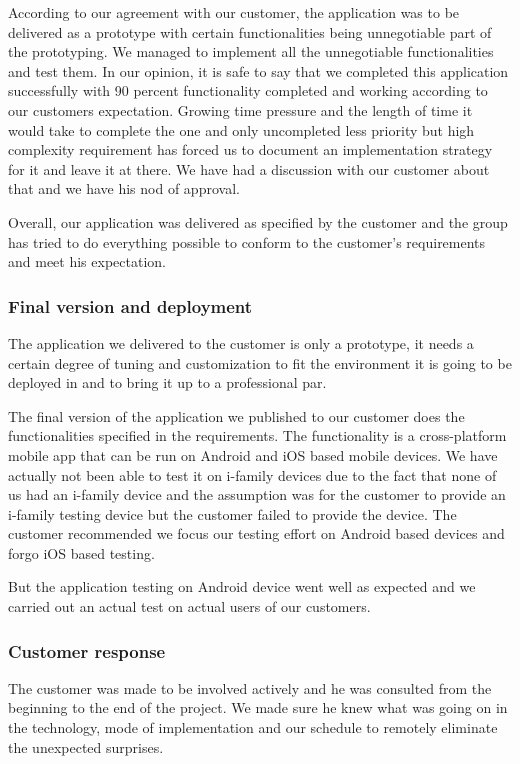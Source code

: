     According to our agreement with our customer, the application was to be delivered as a prototype with certain functionalities being unnegotiable part of the prototyping. We managed to implement all the unnegotiable functionalities and test them. In our opinion, it is safe to say that we completed this application successfully with 90 percent functionality completed and working according to our customers expectation. Growing time pressure and the length of time it would take to complete the one and only uncompleted less priority but high complexity requirement has forced us to document an implementation strategy for it and leave it at there. We have had a discussion with our customer about that and we have his nod of approval.

    Overall, our application was delivered as specified by the customer and the group has tried to do everything possible to conform to the customer's requirements and meet his expectation.
	\subsubsection{Final version and deployment}
The application we delivered to the customer is only a prototype, it needs a certain degree of tuning and customization to fit the environment it is going to be deployed in and to bring it up to a professional par.

The final version of the application we published to our customer does the functionalities specified in the requirements. The functionality is a cross-platform mobile app that can be run on Android and iOS based mobile devices. We have actually not been able to test it on i-family devices due to the fact that none of us had an i-family device and the assumption was for the customer to provide an i-family testing device but the customer failed to provide the device. The customer recommended we focus our testing effort on Android based devices and forgo iOS based testing.

But the application testing on Android device went well as expected and we carried out an actual test on actual users of our customers.


	\subsubsection{Customer response}
The customer was made to be involved actively and he was consulted from the beginning to the end of the project. We made sure he knew what was going on in the technology, mode of implementation and our schedule to remotely eliminate the unexpected surprises.

